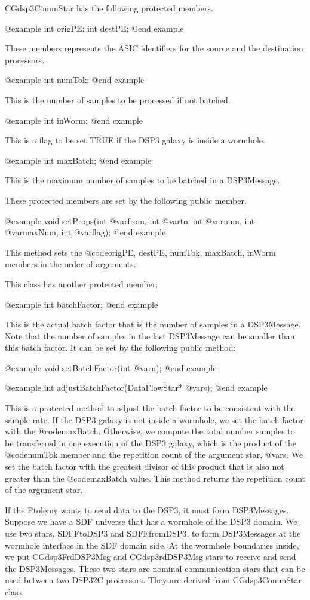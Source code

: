 {CGdsp3CommStar has the following protected members.

@example
int origPE;
int destPE;
@end example

These members represents the ASIC identifiers for the source and the
destination processors.

@example
int numTok;
@end example

This is the number of samples to be processed if not batched.

@example
int inWorm;
@end example

This is a flag to be set TRUE if the DSP3 galaxy is inside a wormhole.

@example
int maxBatch;
@end example

This is the maximum number of samples to be batched in a DSP3Message.

These protected members are set by the following public member.

@example
void setProps(int @var{from}, int @var{to}, int @var{num}, int @var{maxNum}, int @var{flag});
@end example

This method sets the @code{origPE, destPE, numTok, maxBatch, inWorm} members
in the order of arguments.

This class has another protected member:

@example
int batchFactor;
@end example

This is the actual batch factor that is the number of samples in a DSP3Message.
Note that the number of samples in the last DSP3Message can be smaller than
this batch factor.
It can be set by the following public method:

@example
void setBatchFactor(int @var{n});
@end example

@example
int adjustBatchFactor(DataFlowStar* @var{s});
@end example

This is a protected method to adjust the batch factor to be consistent with
the sample rate. If the DSP3 galaxy is not inside a wormhole, we set the
batch factor with the @code{maxBatch}. Otherwise, we compute the
total number samples to be transferred in one execution of the DSP3 galaxy,
which is the product of the @code{numTok} member and the repetition count
of the argument star, @var{s}. We set the batch factor with the greatest
divisor of this product that is also not greater than the @code{maxBatch}
value. This method returns the repetition count of the argument star.

If the Ptolemy wants to send data to the DSP3, it must form DSP3Messages.
Suppose we have a SDF universe that has a wormhole of the DSP3 domain.
We use two stars, SDFFtoDSP3 and SDFFfromDSP3, to form DSP3Messages
at the wormhole interface in the SDF domain side. At the wormhole boundaries
inside, we put CGdsp3FrdDSP3Msg and CGdsp3rdDSP3Msg stars to receive and send
the DSP3Messages. These two stars are nominal communication stars that can
be used between two DSP32C processors. They are derived from 
CGdsp3CommStar class.

}
